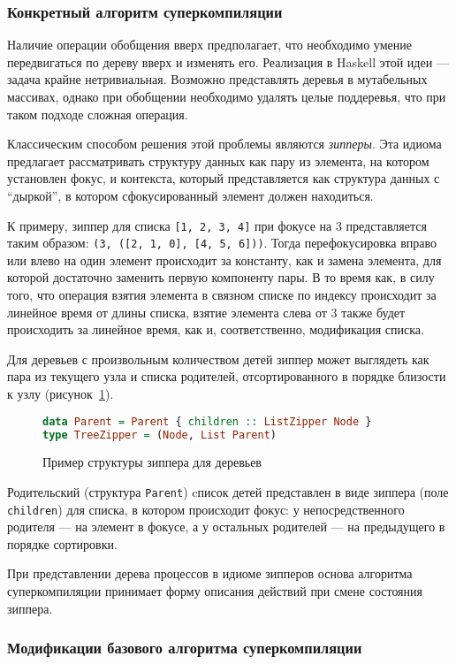 \subsubsection{Конкретный алгоритм суперкомпиляции}

Наличие операции обобщения вверх предполагает, что необходимо умение передвигаться по дереву вверх и изменять его. 
Реализация в Haskell этой идеи --- задача крайне нетривиальная. Возможно представлять
деревья в мутабельных массивах, однако при обобщении необходимо удалять целые поддеревья,
что при таком подходе сложная операция.

Классическим способом решения этой проблемы являются \emph{зипперы}\cite{zipper}.
Эта идиома предлагает рассматривать структуру данных как пару из элемента,
на котором установлен фокус, и контекста, который представляется как структура данных
с ``дыркой'', в котором сфокусированный элемент должен находиться.

К примеру, зиппер для списка \lstinline{[1, 2, 3, 4]} при фокусе на 3 представляется
таким образом: \lstinline{(3, ([2, 1, 0], [4, 5, 6]))}.
Тогда перефокусировка вправо или влево на один элемент происходит за константу,
как и замена элемента, для которой достаточно заменить первую компоненту пары.
В то время как, в силу того, что операция взятия элемента в связном списке по индексу
происходит за линейное время от длины списка, взятие элемента слева от 3 также
будет происходить за линейное время, как и, соответственно, модификация списка.

Для деревьев с произвольным количеством детей зиппер может выглядеть
как пара из текущего узла и списка родителей, отсортированного в порядке
близости к узлу (рисунок~\ref{fig:zipper}). 
\begin{figure}[h!]
\begin{lstlisting}[mathescape,language=Haskell,extendedchars=\true,frame=single,basicstyle=\ttfamily]
data Parent = Parent { children :: ListZipper Node }
type TreeZipper = (Node, List Parent)
\end{lstlisting}
\caption{Пример структуры зиппера для деревьев}
\label{fig:zipper}
\end{figure}

Родительский (структура \lstinline{Parent}) cписок детей представлен в виде зиппера (поле \lstinline{children})
для списка, в котором происходит фокус: у непосредственного родителя --- на элемент в фокусе, а у остальных
родителей --- на предыдущего в порядке сортировки.

При представлении дерева процессов в идиоме зипперов основа алгоритма суперкомпиляции
принимает форму описания действий при смене состояния зиппера.

\subsubsection{Модификации базового алгоритма суперкомпиляции}
